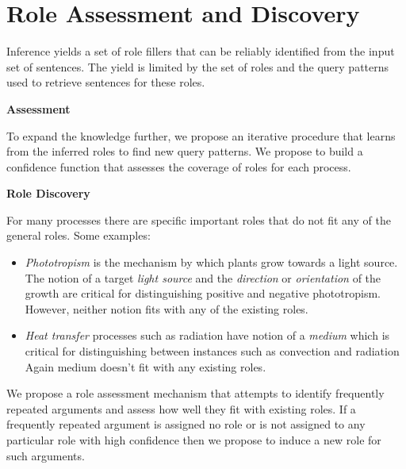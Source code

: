 \section{Role Assessment and Discovery}

Inference yields a set of role fillers that can be reliably identified from the input set of sentences. 
The yield is limited by the set of roles and the query patterns used to retrieve sentences for these roles.

{\bf Assessment}

To expand the knowledge further, we propose an iterative procedure that learns from the inferred roles
to find new query patterns. We propose to build a confidence function that assesses the coverage
of roles for each process.


{\bf Role Discovery}

For many processes there are specific important roles that do not fit any of the general roles. Some examples:
\begin{itemize}
\item {\em Phototropism} is the mechanism by which plants grow towards a light source. 
The notion of a target {\em light source} and the {\em direction} or {\em orientation} of the growth
are critical for distinguishing positive and negative phototropism. However, neither notion fits
with any of the existing roles. 
\item {\em Heat transfer} processes such as radiation have notion of a {\em medium} 
which is critical for distinguishing between instances such as convection and radiation
Again medium doesn't fit with any existing roles. 
\end{itemize}

We propose a role assessment mechanism that attempts to identify frequently repeated arguments
and assess how well they fit with existing roles. If a frequently repeated argument is assigned no role
or is not assigned to any particular role with high confidence then we propose to induce a new role 
for such arguments. 






